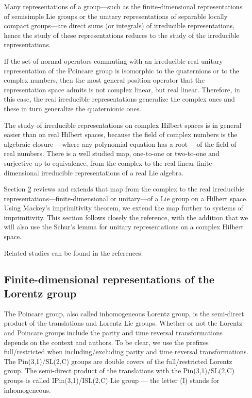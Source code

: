 \documentclass[11pt]{book}
\begin{document}
Many representations of a group---such as the finite-dimensional
representations of semisimple Lie
groups\cite{Hall2003Lie} or the unitary
representations of separable locally compact
groups\cite{Henrichs1979On}---are
direct sums (or integrals) of irreducible representations, hence the
study of these representations reduces to the study of the irreducible
representations.

If the set of normal operators commuting with an irreducible real
unitary representation of the Poincare group is isomorphic to the
quaternions or to the complex numbers, then the most general position
operator that the representation space admits is not complex linear, but
real linear. Therefore, in this case, the real irreducible
representations generalize the complex ones and these in turn generalize
the quaternionic ones.

The study of irreducible representations on complex Hilbert spaces is in
general easier than on real Hilbert spaces, because the field of complex
numbers is the algebraic closure ---where any polynomial equation has a
root--- of the field of real numbers. There is a well studied map,
one-to-one or two-to-one and surjective up to equivalence, from the
complex to the real linear finite-dimensional irreducible
representations of a real Lie
algebra\cite{Oniux161ux10dik2004Lectures}\cite{Iwahori1959On}.

Section \protect\hyperlink{section:Systems}{2} reviews and extends that
map from the complex to the real irreducible
representations---finite-dimensional or unitary---of a Lie group on a
Hilbert space. Using Mackey's imprimitivity theorem, we extend the map
further to systems of imprimitivity. This section follows closely the
reference\cite{Oniux161ux10dik2004Lectures}, with the addition that we will also use
the Schur's lemma for unitary representations on a complex Hilbert
space\cite{Ramakrishnan1999Fourier}.

Related studies can be found in the
references\cite{Bruxf6cker1985Representations}\cite{Plymen1994Spinors}.

\hypertarget{finite-dimensional-representations-of-the-lorentz-group}{%
\subsection{Finite-dimensional representations of the Lorentz
group}\label{finite-dimensional-representations-of-the-lorentz-group}}

The Poincare group, also called inhomogeneous Lorentz group, is the
semi-direct product of the translations and Lorentz Lie
groups\cite{Hall2003Lie}. Whether or not
the Lorentz and Poincare groups include the parity and time reversal
transformations depends on the context and authors. To be clear, we use
the prefixes full/restricted when including/excluding parity and time
reversal transformations. The Pin(3,1)/SL(2,C) groups are double covers
of the full/restricted Lorentz
group\cite{Berg2001Pin}. The
semi-direct product of the translations with the Pin(3,1)/SL(2,C) groups
is called IPin(3,1)/ISL(2,C) Lie group --- the letter (I) stands for
inhomogeneous.
\end{document}
